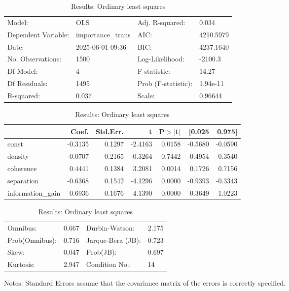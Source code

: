\begin{table}
\caption{Results: Ordinary least squares}
\label{}
\begin{center}
\begin{tabular}{llll}
\hline
Model:              & OLS               & Adj. R-squared:     & 0.034      \\
Dependent Variable: & importance\_trans & AIC:                & 4210.5979  \\
Date:               & 2025-06-01 09:36  & BIC:                & 4237.1640  \\
No. Observations:   & 1500              & Log-Likelihood:     & -2100.3    \\
Df Model:           & 4                 & F-statistic:        & 14.27      \\
Df Residuals:       & 1495              & Prob (F-statistic): & 1.94e-11   \\
R-squared:          & 0.037             & Scale:              & 0.96644    \\
\hline
\end{tabular}
\end{center}

\begin{center}
\begin{tabular}{lrrrrrr}
\hline
                  &   Coef. & Std.Err. &       t & P$> |$t$|$ &  [0.025 &  0.975]  \\
\hline
const             & -0.3135 &   0.1297 & -2.4163 &      0.0158 & -0.5680 & -0.0590  \\
density           & -0.0707 &   0.2165 & -0.3264 &      0.7442 & -0.4954 &  0.3540  \\
coherence         &  0.4441 &   0.1384 &  3.2081 &      0.0014 &  0.1726 &  0.7156  \\
separation        & -0.6368 &   0.1542 & -4.1296 &      0.0000 & -0.9393 & -0.3343  \\
information\_gain &  0.6936 &   0.1676 &  4.1390 &      0.0000 &  0.3649 &  1.0223  \\
\hline
\end{tabular}
\end{center}

\begin{center}
\begin{tabular}{llll}
\hline
Omnibus:       & 0.667 & Durbin-Watson:    & 2.175  \\
Prob(Omnibus): & 0.716 & Jarque-Bera (JB): & 0.723  \\
Skew:          & 0.047 & Prob(JB):         & 0.697  \\
Kurtosis:      & 2.947 & Condition No.:    & 14     \\
\hline
\end{tabular}
\end{center}
\end{table}
\bigskip
Notes: \newline 
[1] Standard Errors assume that the covariance matrix of the errors is correctly specified.